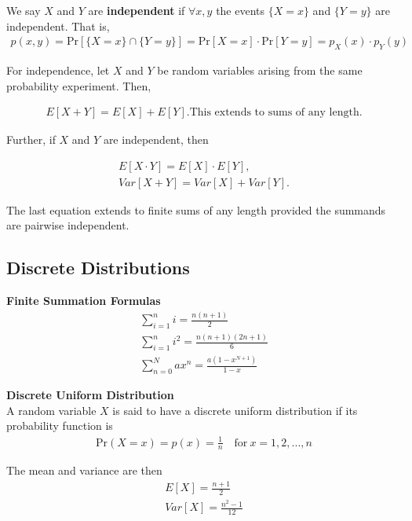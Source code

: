 \documentclass{article}
\numberwithin{theorem}{subsection}
\numberwithin{theorem}{subsubsection}
\theoremstyle{definition}
\numberwithin{definition}{subsection}
\numberwithin{definition}{subsubsection}
\begin{document}
\noindent We say $X$ and $Y$ are \textbf{independent} if $\forall x,y$ the events $\{X=x\}$ and $\{Y=y\}$ are independent. That is,
\begin{gather*}
    p(x,y) = \text{Pr}[\{X = x\} \cap \{Y = y\}] = \text{Pr}[X=x]\cdot \text{Pr}[Y=y] = p_{X}(x) \cdot p_{Y}(y)
\end{gather*}

For independence, let $X$ and $Y$ be random variables arising from the same probability experiment. Then,

\begin{gather*}
    E[X + Y] = E[X] + E[Y]. \text{This extends to sums of any length}.
\end{gather*}

\noindent Further, if $X$ and $Y$ are independent, then

\begin{gather*}
    E[X\cdot Y] = E[X] \cdot E[Y], \\
    Var[X + Y] = Var[X] + Var[Y].
\end{gather*}

\noindent The last equation extends to finite sums of any length provided the summands are pairwise independent.

\subsection{Discrete Distributions}
\noindent \textbf{Finite Summation Formulas} \\
\begin{gather*}
    \sum_{i=1}^{n} i = \frac{n(n+1)}{2} \\
    \sum_{i=1}^{n} i^2 = \frac{n(n+1)(2n+1)}{6} \\
    \sum_{n=0}^{N} ax^{n} = \frac{a(1-x^{N+1})}{1-x}
\end{gather*}

\noindent \textbf{Discrete Uniform Distribution} \\
\indent A random variable $X$ is said to have a discrete uniform distribution if its probability function is
\begin{gather*}
    \text{Pr}(X = x) = p(x) = \frac{1}{n} \quad \text{for}\ x = 1,2,...,n
\end{gather*}

\indent The mean and variance are then
\begin{gather*}
    E[X] = \frac{n+1}{2} \\
    Var[X] = \frac{n^2 - 1}{12}
\end{gather*}
\end{document}
